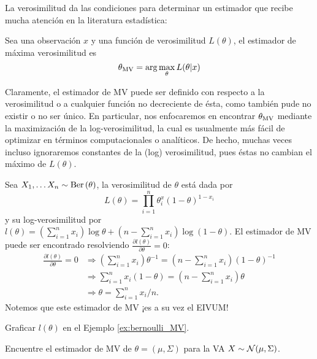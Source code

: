 La verosimilitud da las condiciones para determinar un estimador que recibe mucha atención en la literatura estadística: 

\begin{definition}
	Sea una observación $x$ y una función de verosimilitud $L(\theta)$, el estimador de máxima verosimilitud es 
	\begin{equation}
		{\theta_\text{MV}} = \arg\max_\theta L(\theta|x)
	\end{equation}	
\end{definition}

Claramente, el estimador de MV puede ser definido con respecto a la verosimilitud o a cualquier función no decreciente de ésta, como también pude no existir o no ser único. En particular, nos enfocaremos en encontrar ${\theta_\text{MV}}$ mediante la maximización de la log-verosimilitud, la cual es usualmente más fácil de optimizar en términos computacionales o analíticos. De hecho, muchas veces incluso ignoraremos constantes de la (log) verosimilitud, pues éstas no cambian el máximo de $L(\theta)$.

\begin{example}
	\label{ex:bernoulli_MV}
	Sea $X_1,\ldots X_n\sim\text{Ber}\left(\theta\right)$, la verosimilitud de $\theta$ está dada por 
	\begin{equation}
		L(\theta) = \prod_{i=1}^n\theta^x_i(1-\theta)^{1-x_i}
	\end{equation}
	y su log-verosimilitud por $l(\theta) = (\sum_{i=1}^nx_i)\log \theta + (n-\sum_{i=1}^nx_i)\log(1-\theta)$. El estimador de  MV puede ser encontrado resolviendo $\frac{\partial l(\theta)}{\partial \theta} = 0$:
	\begin{align*}
	\frac{\partial l(\theta)}{\partial \theta} =0 
	&\Rightarrow  (\sum_{i=1}^nx_i) \theta^{-1} = (n-\sum_{i=1}^nx_i)(1-\theta)^{-1}\\
	&\Rightarrow  \sum_{i=1}^nx_i (1-\theta) = (n-\sum_{i=1}^nx_i) \theta\\
	&\Rightarrow  \theta = \sum_{i=1}^nx_i/n.
	\end{align*}
Notemos que este estimador de MV ¡es a su vez el EIVUM!	
\end{example}


\begin{exercise}
	Graficar $l(\theta)$ en el Ejemplo \ref{ex:bernoulli_MV}.
\end{exercise}

\begin{exercise}
	Encuentre el estimador de MV de $\theta = (\mu,\Sigma)$ para la VA $X\sim{\mathcal N}(\mu,\Sigma)$.
\end{exercise}

